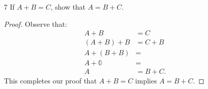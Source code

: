 \documentclass[11pt, b5paper, draft, fleqn]{book}
\theoremstyle{remark}
\theoremstyle{plain}
\begin{document}
\begin{enumerate}
	\item[7] If \(A + B = C\), show that \(A = B + C\).
	\begin{proof}
		Observe that:
		\begin{equation*}
		\begin{split}
			A + B & = C \\
			(A + B) + B & = C + B \\
			A + (B + B) & = \\
			A + \mathbb{0} & = \\
			A & = B + C.
		\end{split}
		\end{equation*}
		This completes our proof that \(A + B = C\) implies \(A = B + C\).
	\end{proof}
\end{enumerate}
\end{document}
